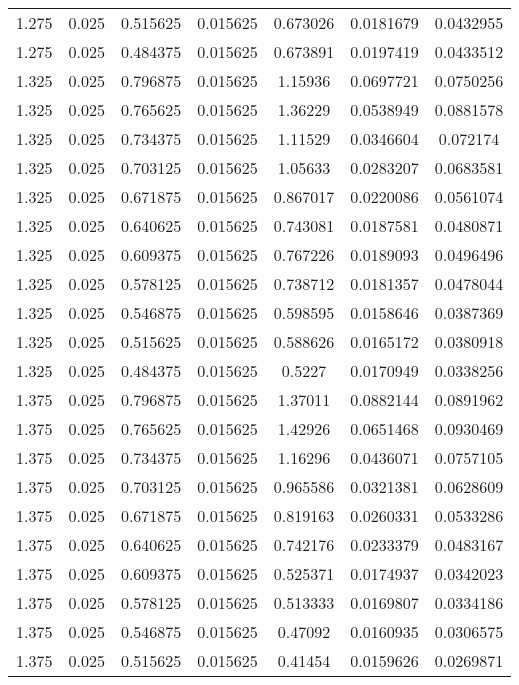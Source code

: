 \begin{flushleft}
\begin{longtable}{ccccccc}
1.275 & 0.025 & 0.515625 & 0.015625 & 0.673026 & 0.0181679 & 0.0432955  \\ 
1.275 & 0.025 & 0.484375 & 0.015625 & 0.673891 & 0.0197419 & 0.0433512  \\ 
1.325 & 0.025 & 0.796875 & 0.015625 & 1.15936 & 0.0697721 & 0.0750256  \\ 
1.325 & 0.025 & 0.765625 & 0.015625 & 1.36229 & 0.0538949 & 0.0881578  \\ 
1.325 & 0.025 & 0.734375 & 0.015625 & 1.11529 & 0.0346604 & 0.072174  \\ 
1.325 & 0.025 & 0.703125 & 0.015625 & 1.05633 & 0.0283207 & 0.0683581  \\ 
1.325 & 0.025 & 0.671875 & 0.015625 & 0.867017 & 0.0220086 & 0.0561074  \\ 
1.325 & 0.025 & 0.640625 & 0.015625 & 0.743081 & 0.0187581 & 0.0480871  \\ 
1.325 & 0.025 & 0.609375 & 0.015625 & 0.767226 & 0.0189093 & 0.0496496  \\ 
1.325 & 0.025 & 0.578125 & 0.015625 & 0.738712 & 0.0181357 & 0.0478044  \\ 
1.325 & 0.025 & 0.546875 & 0.015625 & 0.598595 & 0.0158646 & 0.0387369  \\ 
1.325 & 0.025 & 0.515625 & 0.015625 & 0.588626 & 0.0165172 & 0.0380918  \\ 
1.325 & 0.025 & 0.484375 & 0.015625 & 0.5227 & 0.0170949 & 0.0338256  \\ 
1.375 & 0.025 & 0.796875 & 0.015625 & 1.37011 & 0.0882144 & 0.0891962  \\ 
1.375 & 0.025 & 0.765625 & 0.015625 & 1.42926 & 0.0651468 & 0.0930469  \\ 
1.375 & 0.025 & 0.734375 & 0.015625 & 1.16296 & 0.0436071 & 0.0757105  \\ 
1.375 & 0.025 & 0.703125 & 0.015625 & 0.965586 & 0.0321381 & 0.0628609  \\ 
1.375 & 0.025 & 0.671875 & 0.015625 & 0.819163 & 0.0260331 & 0.0533286  \\ 
1.375 & 0.025 & 0.640625 & 0.015625 & 0.742176 & 0.0233379 & 0.0483167  \\ 
1.375 & 0.025 & 0.609375 & 0.015625 & 0.525371 & 0.0174937 & 0.0342023  \\ 
1.375 & 0.025 & 0.578125 & 0.015625 & 0.513333 & 0.0169807 & 0.0334186  \\ 
1.375 & 0.025 & 0.546875 & 0.015625 & 0.47092 & 0.0160935 & 0.0306575  \\ 
1.375 & 0.025 & 0.515625 & 0.015625 & 0.41454 & 0.0159626 & 0.0269871  \\ 

\end{longtable}
\end{flushleft}
